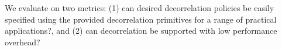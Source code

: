%

%

We evaluate \sys on two metrics: (1) can desired decorrelation policies be easily specified using the
provided decorrelation primitives for a range of practical applications?, and (2) can decorrelation
be supported with low performance overhead?

